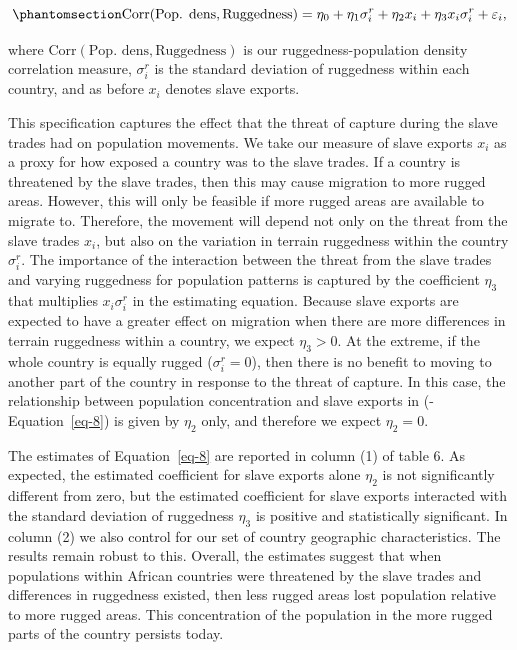 \documentclass[
  letterpaper,
  DIV=11,
  numbers=noendperiod]{scrartcl}
\begin{document}
\begin{equation}\phantomsection\label{eq-8}{
\text{Corr}(\text{Pop. dens}, \text{Ruggedness}) = \eta_0 + \eta_1 \sigma_i^r + \eta_2 x_i + \eta_3 x_i \sigma_i^r + \varepsilon_i,
}\end{equation}

where \(\text{Corr}(\text{Pop. dens}, \text{Ruggedness})\) is our
ruggedness-population density correlation measure, \(\sigma^r_i\) is the
standard deviation of ruggedness within each country, and as before
\(x_i\) denotes slave exports.

This specification captures the effect that the threat of capture during
the slave trades had on population movements. We take our measure of
slave exports \(x_i\) as a proxy for how exposed a country was to the
slave trades. If a country is threatened by the slave trades, then this
may cause migration to more rugged areas. However, this will only be
feasible if more rugged areas are available to migrate to. Therefore,
the movement will depend not only on the threat from the slave trades
\(x_i\), but also on the variation in terrain ruggedness within the
country \(\sigma^r_i\). The importance of the interaction between the
threat from the slave trades and varying ruggedness for population
patterns is captured by the coefficient \(\eta_3\) that multiplies
\(x_i \sigma^r_i\) in the estimating equation. Because slave exports are
expected to have a greater effect on migration when there are more
differences in terrain ruggedness within a country, we expect
\(\eta_3 > 0\). At the extreme, if the whole country is equally rugged
(\(\sigma^r_i = 0\)), then there is no benefit to moving to another part
of the country in response to the threat of capture. In this case, the
relationship between population concentration and slave exports in
(-Equation~\ref{eq-8}) is given by \(\eta_2\) only, and therefore we
expect \(\eta_2 = 0\).

The estimates of Equation~\ref{eq-8} are reported in column (1) of table
6. As expected, the estimated coefficient for slave exports alone
\(\eta_2\) is not significantly different from zero, but the estimated
coefficient for slave exports interacted with the standard deviation of
ruggedness \(\eta_3\) is positive and statistically significant. In
column (2) we also control for our set of country geographic
characteristics. The results remain robust to this. Overall, the
estimates suggest that when populations within African countries were
threatened by the slave trades and differences in ruggedness existed,
then less rugged areas lost population relative to more rugged areas.
This concentration of the population in the more rugged parts of the
country persists today.
\end{document}
